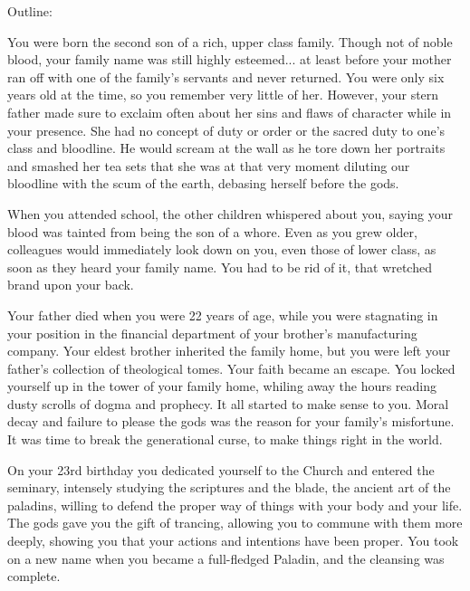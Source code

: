 \documentclass[char]{guildcamp3}
\begin{document}
\name{\cPaladin{}}

\updatemacro{\cNPC}{
  \unknownplayer %
  }



Outline:

You were born the second son of a rich, upper class family. Though not of noble blood, your family name was still highly esteemed... at least before your mother ran off with one of the family's servants and never returned. You were only six years old at the time, so you remember very little of her. However, your stern father made sure to exclaim often about her sins and flaws of character while in your presence. She had no concept of duty or order or the sacred duty to one's class and bloodline. He would scream at the wall as he tore down her portraits and smashed her tea sets that she was at that very moment diluting our bloodline with the scum of the earth, debasing herself before the gods.

When you attended school, the other children whispered about you, saying your blood was tainted from being the son of a whore. Even as you grew older, colleagues would immediately look down on you, even those of lower class, as soon as they heard your family name. You had to be rid of it, that wretched brand upon your back.

Your father died when you were 22 years of age, while you were stagnating in your position in the financial department of your brother's manufacturing company. Your eldest brother inherited the family home, but you were left your father's collection of theological tomes. Your faith became an escape. You locked yourself up in the tower of your family home, whiling away the hours reading dusty scrolls of dogma and prophecy. It all started to make sense to you. Moral decay and failure to please the gods was the reason for your family's misfortune. It was time to break the generational curse, to make things right in the world.

On your 23rd birthday you dedicated yourself to the Church and entered the seminary, intensely studying the scriptures and the blade, the ancient art of the paladins, willing to defend the proper way of things with your body and your life. The gods gave you the gift of trancing, allowing you to commune with them more deeply, showing you that your actions and intentions have been proper. You took on a new name when you became a full-fledged Paladin, and the cleansing was complete.
\end{document}
